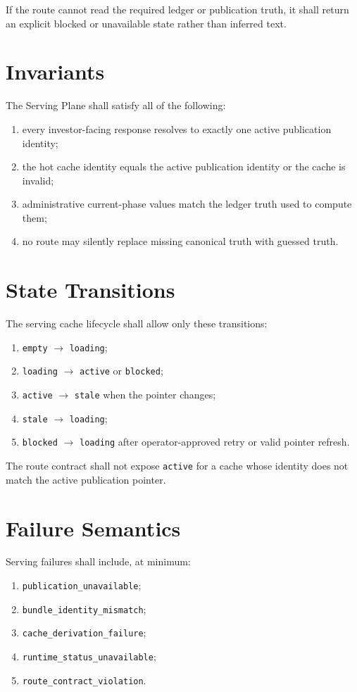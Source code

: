 If the route cannot read the required ledger or publication truth, it shall return an explicit blocked or unavailable state rather than inferred text.

\section{Invariants}
The Serving Plane shall satisfy all of the following:
\begin{enumerate}[leftmargin=1.2cm]
    \item every investor-facing response resolves to exactly one active publication identity;
    \item the hot cache identity equals the active publication identity or the cache is invalid;
    \item administrative current-phase values match the ledger truth used to compute them;
    \item no route may silently replace missing canonical truth with guessed truth.
\end{enumerate}

\section{State Transitions}
The serving cache lifecycle shall allow only these transitions:
\begin{enumerate}[leftmargin=1.2cm]
    \item \texttt{empty} \(\rightarrow\) \texttt{loading};
    \item \texttt{loading} \(\rightarrow\) \texttt{active} or \texttt{blocked};
    \item \texttt{active} \(\rightarrow\) \texttt{stale} when the pointer changes;
    \item \texttt{stale} \(\rightarrow\) \texttt{loading};
    \item \texttt{blocked} \(\rightarrow\) \texttt{loading} after operator-approved retry or valid pointer refresh.
\end{enumerate}

The route contract shall not expose \texttt{active} for a cache whose identity does not match the active publication pointer.

\section{Failure Semantics}
Serving failures shall include, at minimum:
\begin{enumerate}[leftmargin=1.2cm]
    \item \texttt{publication\_unavailable};
    \item \texttt{bundle\_identity\_mismatch};
    \item \texttt{cache\_derivation\_failure};
    \item \texttt{runtime\_status\_unavailable};
    \item \texttt{route\_contract\_violation}.
\end{enumerate}

